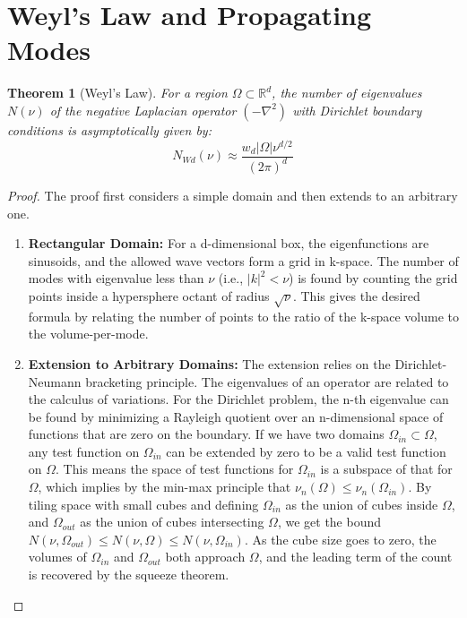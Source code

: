 \documentclass[11pt,a4paper]{article}
\newtheorem{theorem}{Theorem}[section]
\begin{document}
\section{Weyl's Law and Propagating Modes}

\begin{theorem}[Weyl's Law]
For a region \(\Omega\subset\mathbb{R}^{d}\), the number of eigenvalues \(N(\nu)\) of the negative Laplacian operator \((-\nabla^{2})\) with Dirichlet boundary conditions is asymptotically given by:
\begin{equation}
    N_{Wd}(\nu)\approx\frac{w_{d}|\Omega|\nu^{d/2}}{(2\pi)^{d}}
\end{equation}
\end{theorem}

\begin{proof}
The proof first considers a simple domain and then extends to an arbitrary one.
\begin{enumerate}
    \item \textbf{Rectangular Domain:} For a d-dimensional box, the eigenfunctions are sinusoids, and the allowed wave vectors form a grid in k-space. The number of modes with eigenvalue less than \(\nu\) (i.e., \(|k|^{2}<\nu\)) is found by counting the grid points inside a hypersphere octant of radius \(\sqrt{\nu}\). This gives the desired formula by relating the number of points to the ratio of the k-space volume to the volume-per-mode.
    
    \item \textbf{Extension to Arbitrary Domains:} The extension relies on the Dirichlet-Neumann bracketing principle. The eigenvalues of an operator are related to the calculus of variations. For the Dirichlet problem, the n-th eigenvalue can be found by minimizing a Rayleigh quotient over an n-dimensional space of functions that are zero on the boundary. If we have two domains \(\Omega_{in}\subset\Omega\), any test function on \(\Omega_{in}\) can be extended by zero to be a valid test function on \(\Omega\). This means the space of test functions for \(\Omega_{in}\) is a subspace of that for \(\Omega\), which implies by the min-max principle that \(\nu_{n}(\Omega)\le\nu_{n}(\Omega_{in})\). By tiling space with small cubes and defining \(\Omega_{in}\) as the union of cubes inside \(\Omega\), and \(\Omega_{out}\) as the union of cubes intersecting \(\Omega\), we get the bound \(N(\nu,\Omega_{out})\le N(\nu,\Omega)\le N(\nu,\Omega_{in})\). As the cube size goes to zero, the volumes of \(\Omega_{in}\) and \(\Omega_{out}\) both approach \(\Omega\), and the leading term of the count is recovered by the squeeze theorem.
\end{enumerate}
\end{proof}
\end{document}
